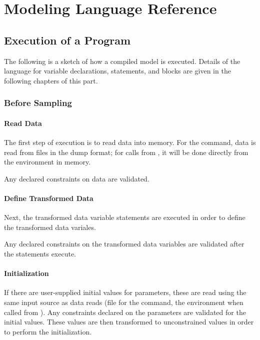 \part{Modeling Language Reference}

\chapter{Execution of a \Stan Program}

The following is a sketch of how a compiled \Stan model is executed.
Details of the language for variable declarations, statements, and
blocks are given in the following chapters of this part.

\section{Before Sampling}

\subsection{Read Data}

The first step of execution is to read data into memory. 
For the \Stan command, data is read from files in the
dump format; for calls from \R, it will be done directly from
the \R environment in memory.

Any declared constraints on data are validated.  

\subsection{Define Transformed Data}

Next, the transformed data variable statements are executed
in order to define the transformed data variales.  

Any declared constraints on the transformed data variables are
validated after the statements execute.

\subsection{Initialization}

If there are user-supplied initial values for parameters, these are
read using the same input source as data reads (file for the \Stan
command, the \R environment when called from \R).  Any constraints
declared on the parameters are validated for the initial values.
These values are then transformed to unconstrained values in order to
perform the initialization.


